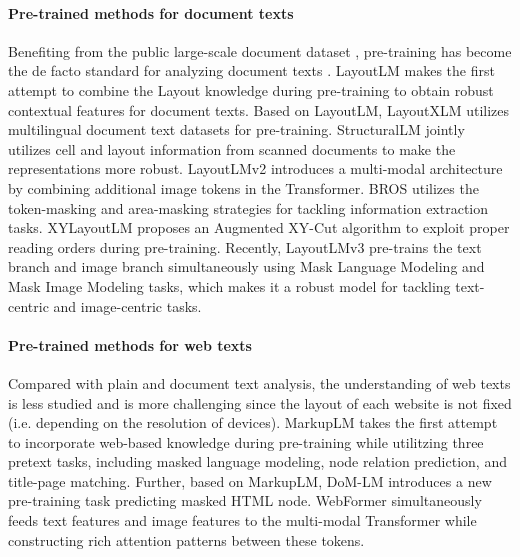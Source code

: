 \documentclass[11pt]{article}
\begin{document}
\paragraph{Pre-trained methods for document texts}
Benefiting from the public large-scale document dataset \cite{lewis2006building}, pre-training has become the de facto standard for analyzing document texts \cite{zhang2020trie,wang2021layoutreader,xu2021layoutxlm,li2022dit,appalaraju2021docformer,garncarek2021lambert,gu2022xylayoutlm,gu2022unified,wu2021lampret,wang2022lilt}. LayoutLM \cite{xu2020layoutlm} makes the first attempt to combine the Layout knowledge during pre-training to obtain robust contextual features for document texts. Based on LayoutLM, LayoutXLM \cite{xu2021layoutxlm} utilizes multilingual document text datasets for pre-training. StructuralLM \cite{li2021structurallm} jointly utilizes cell
and layout information from scanned documents to make the representations more robust.
LayoutLMv2 \cite{xu2020layoutlmv2} introduces a multi-modal architecture by combining additional image tokens in the Transformer. BROS \cite{hong2021bros} utilizes the token-masking and area-masking strategies for tackling information extraction tasks. XYLayoutLM \cite{gu2022xylayoutlm} proposes an Augmented XY-Cut algorithm to exploit proper reading orders during pre-training. Recently, LayoutLMv3 \cite{huang2022layoutlmv3} pre-trains the text branch and image branch simultaneously using Mask Language Modeling and Mask Image Modeling tasks, which makes it a robust model for tackling text-centric and image-centric tasks.

\paragraph{Pre-trained methods for web texts}
Compared with plain and document text analysis, the understanding of web texts is less studied and is more challenging since the layout of each website is not fixed (i.e. depending on the resolution of devices). MarkupLM \cite{li2021markuplm} takes the first attempt to incorporate web-based knowledge during pre-training while utilitzing three pretext tasks, including masked language modeling, node relation prediction, and title-page matching. Further, based on MarkupLM, DoM-LM \cite{deng2022dom} introduces a new pre-training task predicting masked HTML node. WebFormer \cite{wang2022webformer} simultaneously feeds text features and image features to the multi-modal Transformer while constructing rich attention patterns between these tokens.
\end{document}
